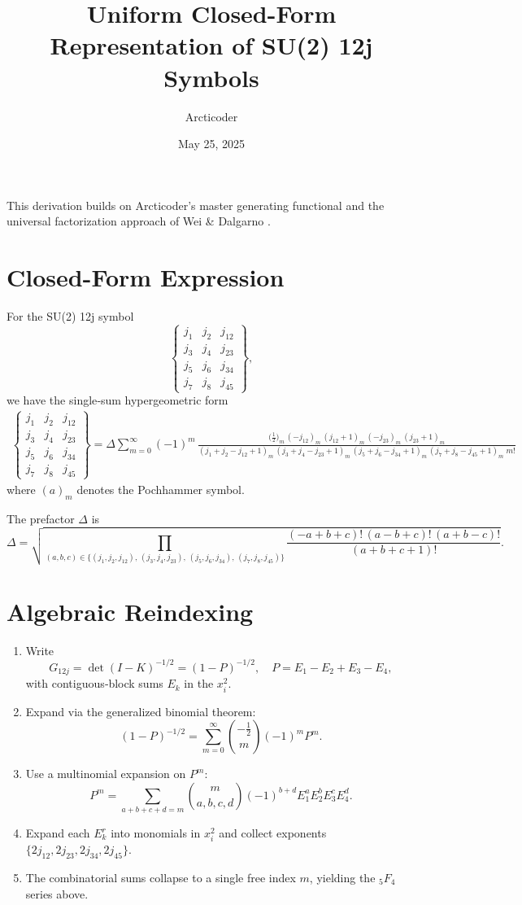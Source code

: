 \documentclass{article}
\title{Uniform Closed-Form Representation of SU(2) 12j Symbols}
\author{Arcticoder}
\date{May 25, 2025}
\begin{document}
\maketitle

This derivation builds on 
Arcticoder’s master generating functional \cite{Arcticoder2025}
and the universal factorization approach of Wei \& Dalgarno \cite{WeiDalgarno2003}.

\section*{Closed-Form Expression}

For the SU(2) 12j symbol
\[
\begin{Bmatrix}
j_1 & j_2 & j_{12}\\
j_3 & j_4 & j_{23}\\
j_5 & j_6 & j_{34}\\
j_7 & j_8 & j_{45}
\end{Bmatrix},
\]
we have the single‐sum hypergeometric form
\[
\boxed{
\begin{aligned}
\begin{Bmatrix}
j_1 & j_2 & j_{12}\\
j_3 & j_4 & j_{23}\\
j_5 & j_6 & j_{34}\\
j_7 & j_8 & j_{45}
\end{Bmatrix}
= \Delta
\sum_{m=0}^{\infty} (-1)^m \,
\frac{\bigl(\tfrac12\bigr)_m\,(-j_{12})_m\,(j_{12}+1)_m\,(-j_{23})_m\,(j_{23}+1)_m}
{(j_1+j_2 - j_{12} +1)_m\,(j_3+j_4 - j_{23} +1)_m\,(j_5+j_6 - j_{34} +1)_m\,(j_7+j_8 - j_{45} +1)_m \; m!}
\end{aligned}
}
\]
where \((a)_m\) denotes the Pochhammer symbol.

The prefactor \(\Delta\) is
\[
\Delta = \sqrt{
\prod_{(a,b,c)\in
\{(j_1,j_2,j_{12}),\,(j_3,j_4,j_{23}),\,(j_5,j_6,j_{34}),\,(j_7,j_8,j_{45})\}}
\frac{(-a+b+c)!\,(a-b+c)!\,(a+b-c)!}{(a+b+c+1)!}
}.
\]

\section*{Algebraic Reindexing}

\begin{enumerate}
  \item Write 
  \[
    G_{12j} = \det(I-K)^{-1/2}
    = (1 - P)^{-1/2},\quad
    P = E_1 - E_2 + E_3 - E_4,
  \]
  with contiguous‐block sums \(E_k\) in the \(x_i^2\).
  \item Expand via the generalized binomial theorem:
  \[
    (1-P)^{-1/2}
    = \sum_{m=0}^\infty \binom{-\tfrac12}{m}(-1)^m P^m.
  \]
  \item Use a multinomial expansion on \(P^m\):
  \[
    P^m = \sum_{a+b+c+d=m}
    \binom{m}{a,b,c,d}(-1)^{b+d}
    E_1^a E_2^b E_3^c E_4^d.
  \]
  \item Expand each \(E_k^r\) into monomials in \(x_i^{2}\) and collect exponents \(\{2j_{12},2j_{23},2j_{34},2j_{45}\}\).
  \item The combinatorial sums collapse to a single free index \(m\), yielding the \({}_5F_4\) series above.
\end{enumerate}
\end{document}
